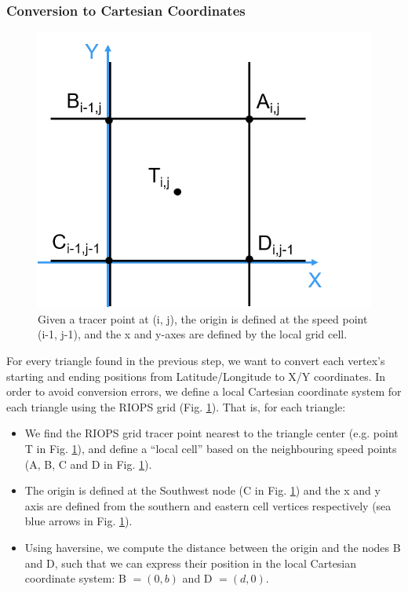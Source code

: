 \documentclass[draft]{agujournal2018}
\begin{document}
\subsubsection{Conversion to Cartesian Coordinates}
\begin{figure}[h]
 \begin{center}
   \includegraphics[scale=.6]{figures/localCS.png}
 \end{center}
 \caption{Given a tracer point at (i, j), the origin is defined at the speed point (i-1, j-1), and the x and y-axes are defined by the local grid cell.}
 \label{axes-locaux}
\end{figure}
For every triangle found in the previous step, we want to convert each vertex's starting and ending positions from Latitude/Longitude to X/Y coordinates. In order to avoid conversion errors, we define a local Cartesian coordinate system for each triangle using the RIOPS grid (Fig. \ref{axes-locaux}). That is, for each triangle:

\begin{itemize}
    \item We find the RIOPS grid tracer point nearest to the triangle center (e.g. point T in Fig. \ref{axes-locaux}), and define a ``local cell'' based on the neighbouring speed points (A, B, C and D in Fig. \ref{axes-locaux}).
    \item The origin is defined at the Southwest node (C in Fig. \ref{axes-locaux}) and the x and y axis are defined from the southern and eastern cell vertices respectively (sea blue arrows in Fig. \ref{axes-locaux}).
    
    \item Using haversine, we compute the distance between the origin and the nodes B and D, such that we can express their position in the local Cartesian coordinate system: B $ = (0, b)$ and D $=(d,0)$.
\end{itemize}
\end{document}

